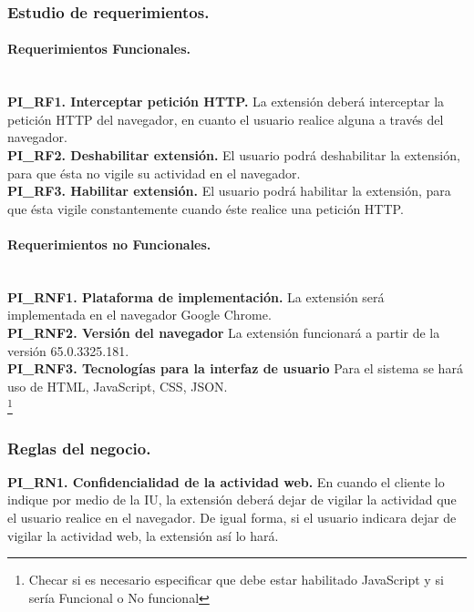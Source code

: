 \documentclass[12pt, a4paper, titlepage]{article}
\begin{document}
			
			\subsubsection{Estudio de requerimientos.}
				
				\paragraph{Requerimientos Funcionales.\\ \\}
				
				{\setlength{\parindent}{12pt}
				\textbf{PI\_RF1. Interceptar petición HTTP.} La extensión deberá interceptar la petición HTTP del navegador, en cuanto el usuario realice alguna a través del navegador.\\

				\textbf{PI\_RF2. Deshabilitar extensión.} El usuario podrá deshabilitar la extensión, para que ésta no vigile su actividad en el navegador.\\
				
				\textbf{PI\_RF3. Habilitar extensión.} El usuario podrá habilitar la extensión, para que ésta vigile constantemente cuando éste realice una petición HTTP.
				}
				
				\paragraph{Requerimientos no Funcionales.\\ \\}
				{\setlength{\parindent}{12pt}
				
				\textbf{PI\_RNF1. Plataforma de implementación.} La extensión será implementada en el navegador Google Chrome.\\
				
				\textbf{PI\_RNF2. Versión del navegador} La extensión funcionará a partir de la versión 65.0.3325.181.\\
				
				\textbf{PI\_RNF3. Tecnologías para la interfaz de usuario} Para el sistema se hará uso de HTML, JavaScript, CSS, JSON.\\
				\footnote{Checar si es necesario especificar que debe estar habilitado JavaScript y si sería Funcional o No funcional}
				
				}
			
			\subsubsection{Reglas del negocio.}
				{\setlength{\parindent}{12pt}
					
				\label{PI_RN1}
				\textbf{PI\_RN1. Confidencialidad de la actividad web.} En cuando el cliente lo indique por medio de la IU, la extensión deberá dejar de vigilar la actividad que el usuario realice en el navegador. De igual forma, si el usuario indicara dejar de vigilar la actividad web, la extensión así lo hará.\\
					
				}\newpage
	\newpage
\end{document}
